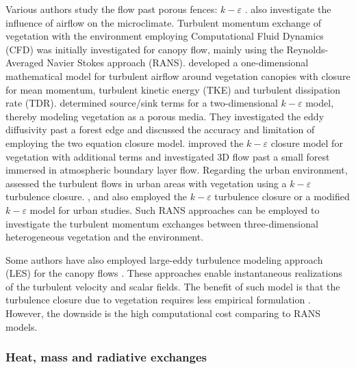 Various authors study the flow past porous fences: $k-\varepsilon$ \citep{Packwood2000, Bourdin2008}. \cite{Cleugh1998} also investigate the influence of airflow on the microclimate. Turbulent momentum exchange of vegetation with the environment employing Computational Fluid Dynamics (CFD) was initially investigated for canopy flow, mainly using the Reynolds-Averaged Navier Stokes approach (RANS). \cite{Wilson1977} developed a one-dimensional mathematical model for turbulent airflow around vegetation canopies with closure for mean momentum, turbulent kinetic energy (TKE) and turbulent dissipation rate (TDR).  \cite{Liu1996} determined source/sink terms for a two-dimensional $k-\varepsilon$ model, thereby modeling vegetation as a porous media. They investigated the eddy diffusivity past a forest edge and discussed the accuracy and limitation of employing the two equation closure model. \cite{Liang2006} improved the  $k-\varepsilon$ closure model for vegetation with additional terms and investigated 3D flow past a small forest immersed in atmospheric boundary layer flow. Regarding the urban environment, \cite{Kenjeres2013} assessed the turbulent flows in urban areas with vegetation using a $k-\varepsilon$ turbulence closure. \cite{Bruse1998}, \cite{Robitu2006} and \cite{Gromke2015c} also employed the  $k-\varepsilon$ turbulence closure or a modified  $k-\varepsilon$ model for urban studies. Such RANS approaches can be employed to investigate the turbulent momentum exchanges between three-dimensional heterogeneous vegetation and the environment. 

Some authors have also employed large-eddy turbulence modeling approach (LES) for the canopy flows \citep{Maruyama2008, Lopes2013,Shaw1992,Moonen2013}. These approaches enable instantaneous realizations of the turbulent velocity and scalar fields. The benefit of such model is that the turbulence closure due to vegetation requires less empirical formulation  \citep{Hiraoka2011,Lopes2013}.  However, the downside is the high computational cost comparing to RANS models.

	
\subsubsection*{Heat, mass and radiative exchanges}

